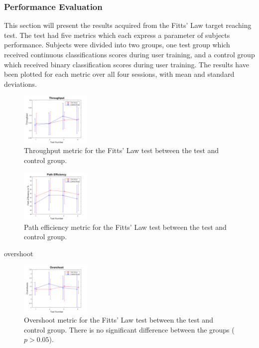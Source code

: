 
\subsubsection*{Performance Evaluation} \label{sec:R:fitts}
This section will present the results acquired from the Fitts' Law target reaching test. The test had five metrics which each express a parameter of subjects performance. Subjects were divided into two groups, one test group which received continuous classifications scores during user training, and a control group which received binary classification scores during user training. The results have been plotted for each metric over all four sessions, with mean and standard deviations.

\begin{figure}[H] 
	\includegraphics[width=0.3\textwidth]{figures/xWesulds/Throughput}
	\caption{Throughput metric for the Fitts' Law test between the test and control group.}
	\label{fig:TPresult}
\end{figure}

\begin{figure}[H] 
	\includegraphics[width=0.3\textwidth]{figures/xWesulds/PathEfficiency}
	\caption{Path efficiency metric for the Fitts' Law test between the test and control group.}
	\label{fig:PEresult}
\end{figure} 

overshoot
\begin{figure}[H] 
	\includegraphics[width=0.3\textwidth]{figures/xWesulds/Overshoot}
	\caption{Overshoot metric for the Fitts' Law test between the test and control group. There is no significant difference between the groups ($p > 0.05$).}
	\label{fig:OSresult}
\end{figure} 

